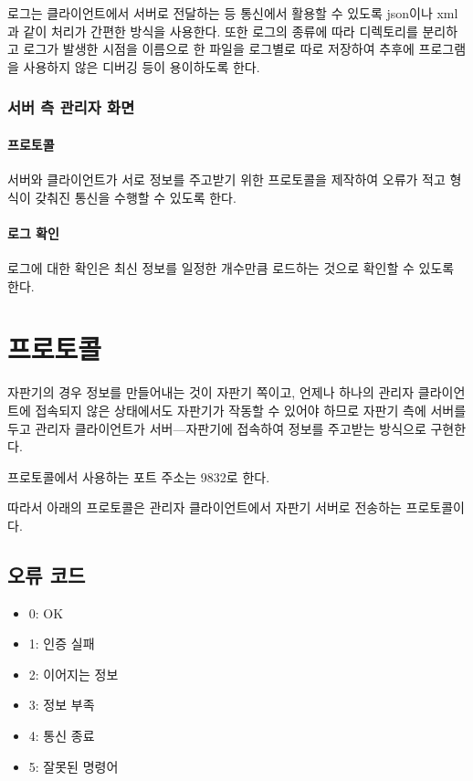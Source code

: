 \documentclass{oblivoir}
\begin{document}
    로그는 클라이언트에서 서버로 전달하는 등 통신에서 활용할 수 있도록
    json이나 xml과 같이 처리가 간편한 방식을 사용한다.
    또한 로그의 종류에 따라 디렉토리를 분리하고 로그가 발생한 시점을
    이름으로 한 파일을 로그별로 따로 저장하여 추후에
    프로그램을 사용하지 않은 디버깅 등이 용이하도록 한다.

    \subsubsection{서버 측 관리자 화면}

    \paragraph{프로토콜}

    서버와 클라이언트가 서로 정보를 주고받기 위한 프로토콜을 제작하여
    오류가 적고 형식이 갖춰진 통신을 수행할 수 있도록 한다.

    \paragraph{로그 확인}

    로그에 대한 확인은 최신 정보를 일정한 개수만큼 로드하는 것으로
    확인할 수 있도록 한다.

    \section{프로토콜}

    자판기의 경우 정보를 만들어내는 것이 자판기 쪽이고,
    언제나 하나의 관리자 클라이언트에 접속되지 않은 상태에서도
    자판기가 작동할 수 있어야 하므로
    자판기 측에 서버를 두고 관리자 클라이언트가 서버---자판기에 접속하여
    정보를 주고받는 방식으로 구현한다.

    프로토콜에서 사용하는 포트 주소는 9832로 한다.

    따라서 아래의 프로토콜은 관리자 클라이언트에서 자판기 서버로
    전송하는 프로토콜이다.

    \subsection{오류 코드}

    \begin{itemize}
        \item 0: OK
        \item 1: 인증 실패
        \item 2: 이어지는 정보
        \item 3: 정보 부족
        \item 4: 통신 종료
        \item 5: 잘못된 명령어
    \end{itemize}
\end{document}
